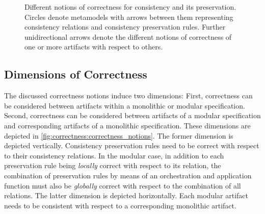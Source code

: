 \begin{figure}
    \centering
    
    \caption[Notions of correctness for consistency and its preservation]{Different notions of correctness for consistency and its preservation. Circles denote metamodels with arrows between them representing consistency relations and consistency preservation rules. Further unidirectional arrows denote the different notions of correctness of one or more artifacts with respect to others.}
    \label{fig:correctness:correctness_notions}
\end{figure}


\subsection{Dimensions of Correctness}
\label{chap:correctness:notions_correctness:dimensions}

The discussed correctness notions induce two dimensions: First, correctness can be considered between artifacts within a monolithic or modular specification. Second, correctness can be considered between artifacts of a modular specification and corresponding artifacts of a monolithic specification. These dimensions are depicted in \autoref{fig:correctness:correctness_notions}.
The former dimension is depicted vertically. Consistency preservation rules need to be correct with respect to their consistency relations.
In the modular case, in addition to each preservation rule being \emph{locally} correct with respect to its relation, the combination of preservation rules by means of an orchestration and application function must also be \emph{globally} correct with respect to the combination of all relations.
The latter dimension is depicted horizontally. Each modular artifact needs to be consistent with respect to a corresponding monolithic artifact.

